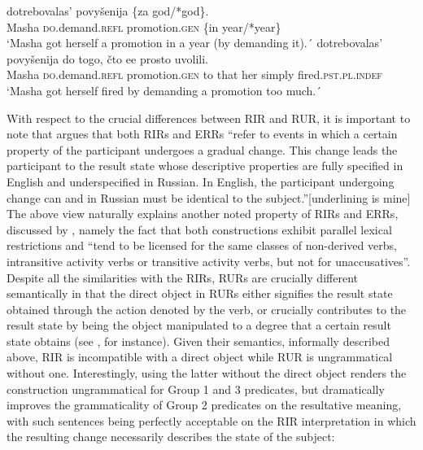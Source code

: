 \documentclass[output=paper,colorlinks,citecolor=brown,nonflat]{./langscibook}
\begin{document}
\ea%
    \label{ex:antonyuk:43}
    \ea \label{ex:antonyuk:43a}
       {dotrebovalas’}          {povyšenija}       {\{za} {god/*god\}}.\\
    Masha \textsc{do}.demand.\textsc{refl} promotion.\textsc{gen} \{in year/*year\}\\
    \glt `Masha got herself  a promotion in a year (by demanding it).´
    \ex \label{ex:antonyuk:43b}
       {dotrebovalas’}            {povyšenija}            {do} {togo,} {čto} {ee}   {prosto} uvolili.\\
    Masha \textsc{do}.demand.\textsc{refl}   promotion.\textsc{gen}     to that {} her simply fired.\textsc{pst.pl.indef}\\
    \glt `Masha got herself fired by demanding a promotion too much.´
    \z
\z

With respect to the crucial differences between RIR and RUR, it is important to note that \citet{Tatevosov2010} argues that both RIRs and ERRs “refer to events in which a certain property of the participant undergoes a gradual change. This change leads the participant to the result state whose descriptive properties are fully specified in English and underspecified in Russian. In English, the participant undergoing change can and in Russian must be identical to the subject.”[underlining is mine] The above view naturally explains another noted property of RIRs and ERRs, discussed by \citeauthor{Tatevosov2010}, namely the fact that both constructions exhibit parallel lexical restrictions and “tend to be licensed for the same classes of non-derived verbs, intransitive activity verbs or transitive activity verbs, but not for unaccusatives”. Despite all the similarities with the RIRs, RURs are crucially different semantically in that the direct object in RURs either signifies the result state obtained through the action denoted by the verb, or crucially contributes to the result state by being the object manipulated to a degree that a certain result state obtains (see , for instance). Given their semantics, informally described above, RIR is incompatible with a direct object while RUR is ungrammatical without one. Interestingly, using the latter without the direct object renders the construction ungrammatical for Group 1 and 3 predicates, but dramatically improves the grammaticality of Group 2 predicates on the resultative meaning, with such sentences being perfectly acceptable on the RIR interpretation in which the resulting change necessarily describes the state of the subject:
\end{document}

